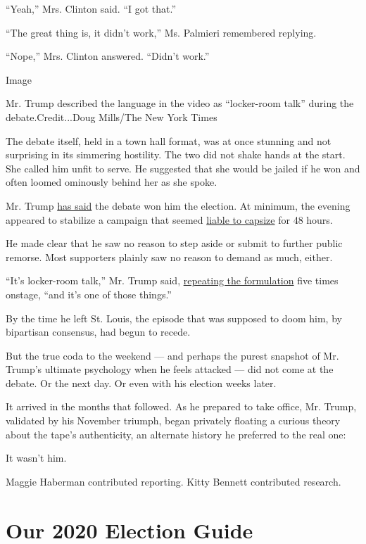 ``Yeah,'' Mrs. Clinton said. ``I got that.''

``The great thing is, it didn't work,'' Ms. Palmieri remembered
replying.

``Nope,'' Mrs. Clinton answered. ``Didn't work.''

Image

Mr. Trump described the language in the video as ``locker-room talk''
during the debate.Credit...Doug Mills/The New York Times

The debate itself, held in a town hall format, was at once stunning and
not surprising in its simmering hostility. The two did not shake hands
at the start. She called him unfit to serve. He suggested that she would
be jailed if he won and often loomed ominously behind her as she spoke.

Mr. Trump
\href{https://www.politico.com/magazine/story/2019/07/10/american-carnage-excerpt-access-hollywood-tape-227269}{has
said} the debate won him the election. At minimum, the evening appeared
to stabilize a campaign that seemed
\href{https://www.huffpost.com/entry/yahoo-64-hours-october-american-politics_n_59d7c567e4b072637c43dd1c}{liable
to capsize} for 48 hours.

He made clear that he saw no reason to step aside or submit to further
public remorse. Most supporters plainly saw no reason to demand as much,
either.

``It's locker-room talk,'' Mr. Trump said,
\href{https://www.nytimes.com/2016/10/10/us/politics/transcript-second-debate.html}{repeating
the formulation} five times onstage, ``and it's one of those things.''

By the time he left St. Louis, the episode that was supposed to doom
him, by bipartisan consensus, had begun to recede.

But the true coda to the weekend --- and perhaps the purest snapshot of
Mr. Trump's ultimate psychology when he feels attacked --- did not come
at the debate. Or the next day. Or even with his election weeks later.

It arrived in the months that followed. As he prepared to take office,
Mr. Trump, validated by his November triumph, began privately floating a
curious theory about the tape's authenticity, an alternate history he
preferred to the real one:

It wasn't him.

Maggie Haberman contributed reporting. Kitty Bennett contributed
research.

\hypertarget{our-2020-election-guide}{%
\section{Our 2020 Election Guide}\label{our-2020-election-guide}}


